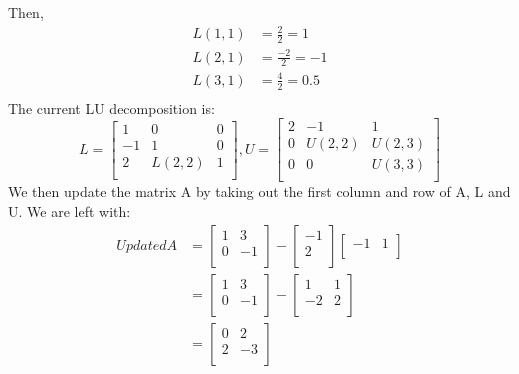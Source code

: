 \documentclass{article}
\DeclareMathOperator{\1}{\mathit{1}}
\numberwithin{figure}{section} %
\begin{document}
Then,
    \begin{align*}
        L(1,1) &= \frac{2}{2} = 1 \\
        L(2,1) &= \frac{-2}{2} = -1 \\
        L(3,1) &= \frac{4}{2} = 0.5 \\
    \end{align*}
The current LU decomposition is:
    \[
        L = 
        \begin{bmatrix}
            1 & 0 & 0 \\
            -1 & 1 & 0 \\
            2 & L(2,2) & 1 \\
        \end{bmatrix} ,
        U = 
            \begin{bmatrix}
                2 & -1 & 1 \\
                0 & U(2,2) & U(2,3) \\
                0 & 0 & U(3,3) \\
            \end{bmatrix}
    \]
We then update the matrix A by taking out the first column and row of A, L and U. We are left with:
    \[
    \begin{aligned}
        UpdatedA 
        &= 
            \begin{bmatrix}
                1 & 3 \\
                0 & -1 \\
            \end{bmatrix} - 
            \begin{bmatrix}
                -1  \\
                2  \\
            \end{bmatrix}
            \begin{bmatrix}
                -1 & 1 \\
            \end{bmatrix} \\ 
        &= 
            \begin{bmatrix}
                1 & 3 \\
                0 & -1 \\
            \end{bmatrix} - 
            \begin{bmatrix}
                1 & 1 \\
                -2 & 2 \\
            \end{bmatrix} \\
        &= 
            \begin{bmatrix}
                0 & 2 \\
                2 & -3 \\
            \end{bmatrix} 
    \end{aligned}
    \]
\end{document}
